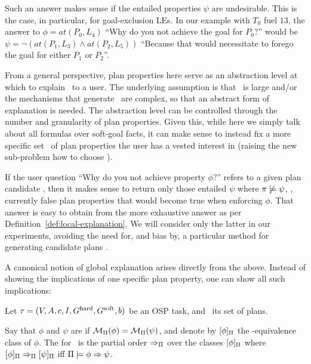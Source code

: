 Such an answer makes sense if the entailed properties $\psi$ are
undesirable. This is the case, in particular, for goal-exclusion
LEs. In our example with $T_0$ fuel $13$, the answer to $\phi =
at(P_0,L_4)$ ``Why do you not achieve the goal for $P_0$?'' would be
$\psi = \neg (at(P_1,L_3) \wedge at(P_2,L_5))$ ``Because that would
necessitate to forego the goal for either $P_1$ or $P_2$''.

From a general perspective, plan properties here serve as an
abstraction level at which to explain \plans\ to a user. The
underlying assumption is that \plans\ is large and/or the mechanisms
that generate \plans\ are complex, so that an abstract form of
explanation is needed. The abstraction level can be controlled through
the number and granularity of plan properties. Given this, while here
we simply talk about all formulas over soft-goal facts, it can make
sense to instead fix a more specific set \props\ of plan properties
the user has a vested interest in (raising the new sub-problem how to
choose \props).

If the user question ``Why do you not achieve property $\phi$?''
refers to a given plan candidate \plan, then it makes sense to return
only those entailed $\psi$ where $\pi \not\models \psi$, \ie,
currently false plan properties that would become true when enforcing
$\phi$. That answer is easy to obtain from the more exhaustive answer
as per Definition~\ref{def:local-explanation}. We will consider only
the latter in our experiments, avoiding the need for, and bias by, a
particular method for generating candidate plans \plan. 

A canonical notion of global explanation arises directly from the
above.  Instead of showing the implications of one specific plan
property, one can show all such implications:

\begin{definition}
Let $\tau =
(V,\allowbreak A,\allowbreak{\ensuremath{c}},\allowbreak I,\allowbreak G^{\text{\textup{hard}}},\allowbreak G^{\text{\textup{soft}}},\allowbreak{\ensuremath{b}})$
be an OSP task, and \plans\ its set of plans.

Say that $\phi$ and $\psi$ are  if
${\cal M}_{\Pi}(\phi) = {\cal M}_{\Pi}(\psi)$, and denote by
$[\phi]_{\Pi}$ the \plans-equivalence class of $\phi$.
%
The  for \task\ is the partial order
$\Rightarrow_{\Pi}$ over the classes $[\phi]_{\Pi}$ where
$[\phi]_{\Pi} \Rightarrow_{\Pi} [\psi]_{\Pi}$ iff
$\Pi \models \phi \Rightarrow \psi$.
%
\end{definition}

